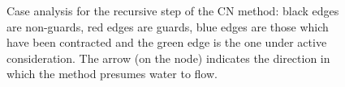 \documentclass[preprint,a4paper]{elsarticle}
\newenvironment{stusubfig}[1]
{
	\begin{figure}[#1]
	\begin{center}
}
{
	\end{center}
	\end{figure}
}
\begin{document}
\begin{stusubfig}{p}
	\hspace{4mm}%
\caption[Case analysis for the recursive step of the CN method]{Case analysis for the recursive step of the CN method: black edges are non-guards, red edges are guards, blue edges are those which have been contracted and the green edge is the one under active consideration. The arrow (on the node) indicates the direction in which the method presumes water to flow.}
\label{fig:segmentation-waterfall-nicholls-cases}
\end{stusubfig}
\end{document}

